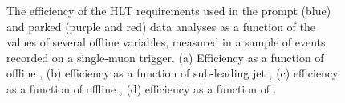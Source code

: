 \begin{figure}
  \caption{The efficiency of the \ac{HLT} requirements used in the prompt (blue) and parked (purple and red) data analyses as a function of the values of several offline variables, measured in a sample of events recorded on a single-muon trigger. (a) Efficiency as a function of offline \detajj, (b) efficiency as a function of sub-leading jet \pt, (c) efficiency as a function of offline \METnoMU, (d) efficiency as a function of \Mjj.}
  \label{fig:prompttrigplots}
\end{figure}


